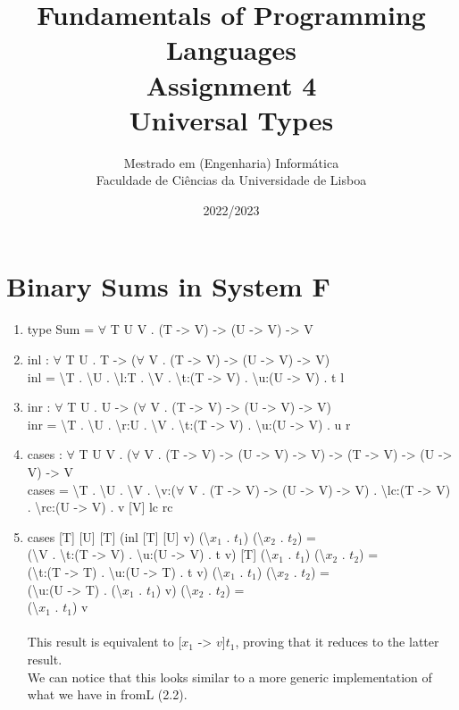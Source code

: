 \documentclass[a4paper]{article}
\title{
  \color{blue}Fundamentals of Programming Languages\\[1ex]
  Assignment 4\\[1ex]
  Universal Types}
\author{Mestrado em (Engenharia) Informática\\
  Faculdade de Ciências da Universidade de Lisboa
}
\date{2022/2023}
\begin{document}
\maketitle
\setlength{\parskip}{1ex}
\thispagestyle{empty}

\section{Binary Sums in System F}
\begin{enumerate}
  \item type Sum = $\forall$ T U V . (T -> V) -> (U -> V) -> V
  \item inl : $\forall$ T U . T -> ($\forall$ V . (T -> V) -> (U -> V) -> V) \\
        inl = \textbackslash T . \textbackslash U . \textbackslash l:T . \textbackslash V . \textbackslash t:(T -> V) . \textbackslash u:(U -> V) . t l
  \item inr : $\forall$ T U . U -> ($\forall$ V . (T -> V) -> (U -> V) -> V) \\
  inr = \textbackslash T . \textbackslash U . \textbackslash r:U . \textbackslash V . \textbackslash t:(T -> V) . \textbackslash u:(U -> V) . u r
  \item cases : $\forall$ T U V . ($\forall$ V . (T -> V) -> (U -> V) -> V) -> (T -> V) -> (U -> V) -> V \\
  cases = \textbackslash T . \textbackslash U . \textbackslash V . \textbackslash v:($\forall$ V . (T -> V) -> (U -> V) -> V) . \textbackslash lc:(T -> V) . \textbackslash rc:(U -> V) . v [V] lc rc
  \item cases [T] [U] [T] (inl [T] [U] v) (\textbackslash $x_1$ . $t_1$) (\textbackslash $x_2$ . $t_2$) = \\
    (\textbackslash V . \textbackslash t:(T -> V) . \textbackslash u:(U -> V) . t v) [T] (\textbackslash $x_1$ . $t_1$) (\textbackslash $x_2$ . $t_2$) = \\
    (\textbackslash t:(T -> T) . \textbackslash u:(U -> T) . t v) (\textbackslash $x_1$ . $t_1$) (\textbackslash $x_2$ . $t_2$) = \\
    (\textbackslash u:(U -> T) . (\textbackslash $x_1$ . $t_1$) v) (\textbackslash $x_2$ . $t_2$) = \\
    (\textbackslash $x_1$ . $t_1$) v \\\\
    This result is equivalent to [$x_1$ -> $v$]$t_1$, proving that it reduces to the latter result.\\
    We can notice that this looks similar to a more generic implementation of what we have in fromL (2.2).

\end{enumerate}
\end{document}
